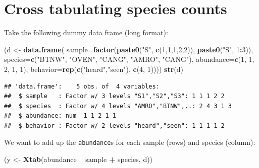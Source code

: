 \documentclass[12pt,]{book}
\newenvironment{Shaded}{\begin{snugshade}}{\end{snugshade}}
\newcommand{\DataTypeTok}[1]{\textcolor[rgb]{0.13,0.29,0.53}{#1}}
\newcommand{\DecValTok}[1]{\textcolor[rgb]{0.00,0.00,0.81}{#1}}
\newcommand{\KeywordTok}[1]{\textcolor[rgb]{0.13,0.29,0.53}{\textbf{#1}}}
\newcommand{\NormalTok}[1]{#1}
\newcommand{\OperatorTok}[1]{\textcolor[rgb]{0.81,0.36,0.00}{\textbf{#1}}}
\newcommand{\StringTok}[1]{\textcolor[rgb]{0.31,0.60,0.02}{#1}}
\begin{document}
\hypertarget{cross-tabulating-species-counts}{%
\section{Cross tabulating species counts}\label{cross-tabulating-species-counts}}

Take the following dummy data frame (long format):

\begin{Shaded}
\begin{Highlighting}[]
\NormalTok{(d <-}\StringTok{ }\KeywordTok{data.frame}\NormalTok{(}
  \DataTypeTok{sample=}\KeywordTok{factor}\NormalTok{(}\KeywordTok{paste0}\NormalTok{(}\StringTok{"S"}\NormalTok{, }\KeywordTok{c}\NormalTok{(}\DecValTok{1}\NormalTok{,}\DecValTok{1}\NormalTok{,}\DecValTok{1}\NormalTok{,}\DecValTok{2}\NormalTok{,}\DecValTok{2}\NormalTok{)), }\KeywordTok{paste0}\NormalTok{(}\StringTok{"S"}\NormalTok{, }\DecValTok{1}\OperatorTok{:}\DecValTok{3}\NormalTok{)),}
  \DataTypeTok{species=}\KeywordTok{c}\NormalTok{(}\StringTok{"BTNW"}\NormalTok{, }\StringTok{"OVEN"}\NormalTok{, }\StringTok{"CANG"}\NormalTok{, }\StringTok{"AMRO"}\NormalTok{, }\StringTok{"CANG"}\NormalTok{),}
  \DataTypeTok{abundance=}\KeywordTok{c}\NormalTok{(}\DecValTok{1}\NormalTok{, }\DecValTok{1}\NormalTok{, }\DecValTok{2}\NormalTok{, }\DecValTok{1}\NormalTok{, }\DecValTok{1}\NormalTok{),}
  \DataTypeTok{behavior=}\KeywordTok{rep}\NormalTok{(}\KeywordTok{c}\NormalTok{(}\StringTok{"heard"}\NormalTok{,}\StringTok{"seen"}\NormalTok{), }\KeywordTok{c}\NormalTok{(}\DecValTok{4}\NormalTok{, }\DecValTok{1}\NormalTok{))))}
\KeywordTok{str}\NormalTok{(d)}
\end{Highlighting}
\end{Shaded}

\begin{verbatim}
## 'data.frame':    5 obs. of  4 variables:
##  $ sample   : Factor w/ 3 levels "S1","S2","S3": 1 1 1 2 2
##  $ species  : Factor w/ 4 levels "AMRO","BTNW",..: 2 4 3 1 3
##  $ abundance: num  1 1 2 1 1
##  $ behavior : Factor w/ 2 levels "heard","seen": 1 1 1 1 2
\end{verbatim}

We want to add up the \texttt{abundance}s for each sample (rows) and species (column):

\begin{Shaded}
\begin{Highlighting}[]
\NormalTok{(y <-}\StringTok{ }\KeywordTok{Xtab}\NormalTok{(abundance }\OperatorTok{~}\StringTok{ }\NormalTok{sample }\OperatorTok{+}\StringTok{ }\NormalTok{species, d))}
\end{Highlighting}
\end{Shaded}
\end{document}
